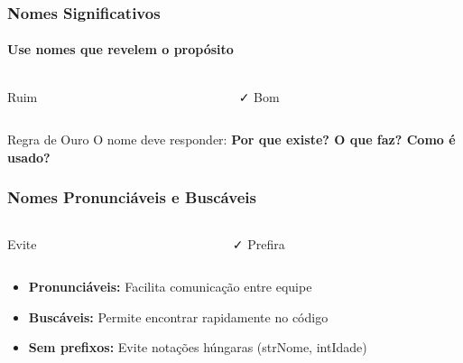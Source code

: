\documentclass[aspectratio=169]{beamer}
\begin{document}
\begin{frame}
\frametitle{Nomes Significativos}
\framesubtitle{Use nomes que revelem o propósito}

\begin{columns}
\begin{column}{0.5\textwidth}
\begin{block}{\textcolor{cleanred}{\faTimes} Ruim}

\end{block}
\end{column}

\begin{column}{0.5\textwidth}
\begin{block}{\textcolor{cleangreen}{\faCheck} Bom}

\end{block}
\end{column}
\end{columns}

\vspace{0.5cm}
\begin{alertblock}{Regra de Ouro}
\centering
O nome deve responder: \textbf{Por que existe? O que faz? Como é usado?}
\end{alertblock}
\end{frame}

\begin{frame}
\frametitle{Nomes Pronunciáveis e Buscáveis}

\begin{columns}
\begin{column}{0.5\textwidth}
\begin{block}{\textcolor{cleanred}{\faTimes} Evite}

\end{block}
\end{column}

\begin{column}{0.5\textwidth}
\begin{block}{\textcolor{cleangreen}{\faCheck} Prefira}

\end{block}
\end{column}
\end{columns}

\vspace{0.5cm}
\begin{itemize}
    \item \textbf{Pronunciáveis:} Facilita comunicação entre equipe
    \item \textbf{Buscáveis:} Permite encontrar rapidamente no código
    \item \textbf{Sem prefixos:} Evite notações húngaras (strNome, intIdade)
\end{itemize}
\end{frame}
\end{document}
